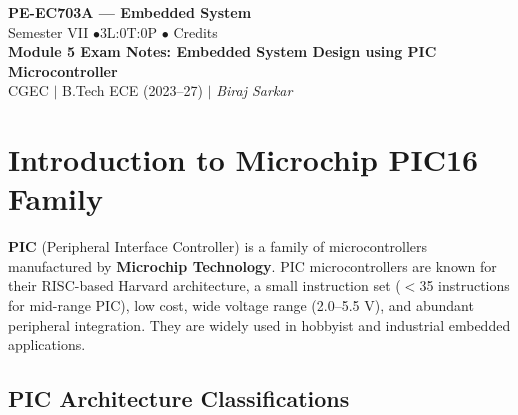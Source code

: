 \documentclass[12pt,a4paper]{article}
\begin{document}

\begin{center}
  {\LARGE\bfseries\color{myred} PE-EC703A --- Embedded System}\\[5pt]
  {\normalsize\color{mydark} Semester VII \quad$\bullet$\quad 3L:0T:0P \quad$\bullet$ Credits}\\[3pt]
  {\normalsize\color{myteal}\textbf{Module 5 Exam Notes: Embedded System Design using PIC Microcontroller}}\\[3pt]
  {\small\color{mydark} CGEC \;$|$\; B.Tech ECE (2023--27) \;$|$\; \textit{Biraj Sarkar}}
\end{center}
\vspace{2pt}
\noindent{\color{myred}\rule{\linewidth}{1.5pt}}
\vspace{2pt}

\hypersetup{linkcolor=mydark}
\tableofcontents
\hypersetup{linkcolor=myteal}
\newpage

\section{Introduction to Microchip PIC16 Family}

\begin{tcolorbox}[defbox, title={\textbf{PIC Microcontroller}}]
\textbf{PIC} (Peripheral Interface Controller) is a family of microcontrollers manufactured by \textbf{Microchip Technology}. PIC microcontrollers are known for their RISC-based Harvard architecture, a small instruction set ($<$35 instructions for mid-range PIC), low cost, wide voltage range (2.0--5.5 V), and abundant peripheral integration. They are widely used in hobbyist and industrial embedded applications.
\end{tcolorbox}

\subsection{PIC Architecture Classifications}
\end{document}
